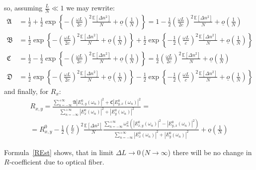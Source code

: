\documentclass[12pt, notitlepage]{report}
\begin{document}
so, assuming $\frac{L}{N} \ll 1$ we may rewrite:
\begin{align*}
	\mathfrak{A} &= \frac{1}{2} + \frac{1}{2}\exp\left\{ -\left(\frac{\omega L}{2c}\right)^2\frac{\mathbb{E}\left[\Delta n^2\right]}{N} + \underline{o}\left(\frac{1}{N}\right) \right\} = 1 -\frac{1}{2}\left(\frac{\omega L}{2c}\right)^2\frac{\mathbb{E}\left[\Delta n^2\right]}{N} + \underline{o}\left(\frac{1}{N}\right) \\
	\mathfrak{B} &= \frac{1}{2}\exp\left\{ -\left(\frac{\omega L}{2c}\right)^2\frac{\mathbb{E}\left[\Delta n^2\right]}{N} + \underline{o}\left(\frac{1}{N}\right) \right\} + \frac{1}{2}\exp\left\{-\frac{1}{2} \left(\frac{\omega L}{c}\right)^2\frac{\mathbb{E}\left[\Delta n^2\right]}{N} + \underline{o}\left(\frac{1}{N}\right) \right\} \\
	\mathfrak{C} &= \frac{1}{2} - \frac{1}{2} \exp\left\{ -\left(\frac{\omega L}{2c}\right)^2\frac{\mathbb{E}\left[\Delta n^2\right]}{N} + \underline{o}\left(\frac{1}{N}\right) \right\} = \frac{1}{2}\left(\frac{\omega L}{2c}\right)^2\frac{\mathbb{E}\left[\Delta n^2\right]}{N} + \underline{o}\left(\frac{1}{N}\right) \\
	\mathfrak{D} &= \frac{1}{2}\exp\left\{ -\left(\frac{\omega L}{2c}\right)^2\frac{\mathbb{E}\left[\Delta n^2\right]}{N} + \underline{o}\left(\frac{1}{N}\right) \right\} - \frac{1}{2}\exp\left\{-\frac{1}{2} \left(\frac{\omega L}{c}\right)^2\frac{\mathbb{E}\left[\Delta n^2\right]}{N} + \underline{o}\left(\frac{1}{N}\right) \right\}
\end{align*}
and finally, for $R_x$:
\begin{multline}
	\label{REst}
	R_{x,y} = \frac{\sum\limits_{n=-\infty}^{+\infty} \mathfrak{A}\left|E^0_{x,y}(\omega_n)\right|^2 + \mathfrak{C}\left|E^0_{y,x}(\omega_n)\right|^2}{\sum\limits_{n=-\infty}^{+\infty} \left|E_x^0(\omega_n)\right|^2 + \left|E_y^0(\omega_n)\right|^2} = \\ =
	R^0_{x,y} - \frac{1}{2}\left(\frac{L}{c}\right)^2\frac{\mathbb{E}\left[\Delta n^2\right]}{N} \frac{\sum\limits_{n=-\infty}^{+\infty} \omega_n^2\left(\left|E^0_{x,y}(\omega_n)\right|^2 - \left|E^0_{y,x}(\omega_n)\right|^2\right)}{\sum\limits_{n=-\infty}^{+\infty} \left|E_x^0(\omega_n)\right|^2 + \left|E_y^0(\omega_n)\right|^2} + \underline{o}\left(\frac{1}{N}\right)
\end{multline}

Formula~\eqref{REst} shows, that in limit $\Delta L \rightarrow 0$\,($N\rightarrow \infty$) there will be no change in $R$-coefficient due to optical fiber.
\end{document}
